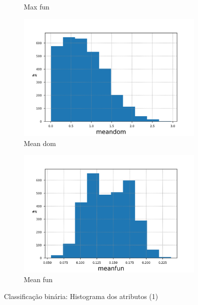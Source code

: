 \documentclass{article}
\begin{document}
\begin{figure}[H]
\begin{subfigure}{.5\textwidth}
                \caption{Max fun}
            \end{subfigure}
            \begin{subfigure}{.5\textwidth}
                \centering
                \includegraphics[width=.8\linewidth]{img1/data_histmeandom.png}
                \caption{Mean dom}
            \end{subfigure}
            \begin{subfigure}{.5\textwidth}
                \centering
                \includegraphics[width=.8\linewidth]{img1/data_histmeanfun.png}
                \caption{Mean fun}
            \end{subfigure}
        \caption{Classificação binária: Histograma dos atributos (1)}
        \label{fig:a_hist_1}
        \end{figure}
\end{document}
